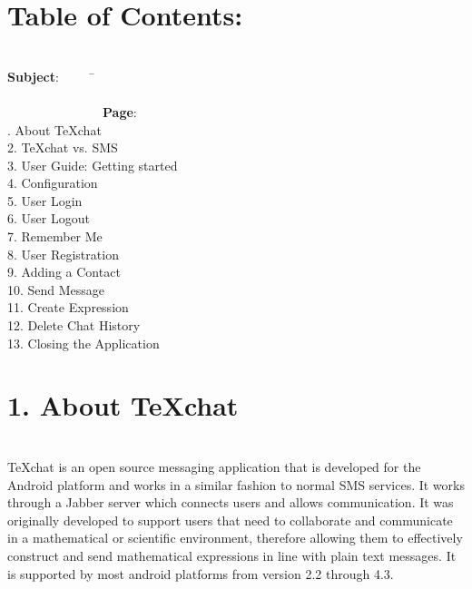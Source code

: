 \documentclass[29pt,a4paper]{moderncv}
\begin{document}
\section{\textbf{Table of Contents:}}
\begin{tabbing}
\\\textbf{Subject}: ~~~~~\= ~~~~~~~~~~~~~~~~~~~~~~~~~~~~~~~~~~~~~~~~~~~~~~~~~~~~~~~~~~~~~~~~~~~~~~~~~~~~~~~~~~~~~~~\= \textbf{Page}:
\\. About TeXchat \> \\
2. TeXchat vs. SMS \> \\
3. User Guide: Getting started\> \\
4. Configuration \>  \\
5. User Login	\> 			\\
6. User Logout \>  	\\
7. Remember Me \> \\
8. User Registration \>  	\\
9. Adding a Contact\>  	\\
10. Send Message \> \\
11. Create Expression \> \\
12. Delete Chat History \>  	\\
13. Closing the Application \>  	\\
\end{tabbing}

\newpage
	\section*{\textbf{1. About TeXchat}}
	\vspace{4mm}
			\\TeXchat is an open source messaging application that is developed for the Android platform and works in a similar fashion to normal SMS services.  It works through a Jabber server which connects users and allows communication.  It was originally developed to support users that need to collaborate and communicate in a mathematical or scientific environment, therefore allowing them to effectively construct and send mathematical expressions in line with plain text messages. It is supported by most android platforms from version 2.2 through 4.3.\\
		\vspace{5mm}
		
\end{document}
